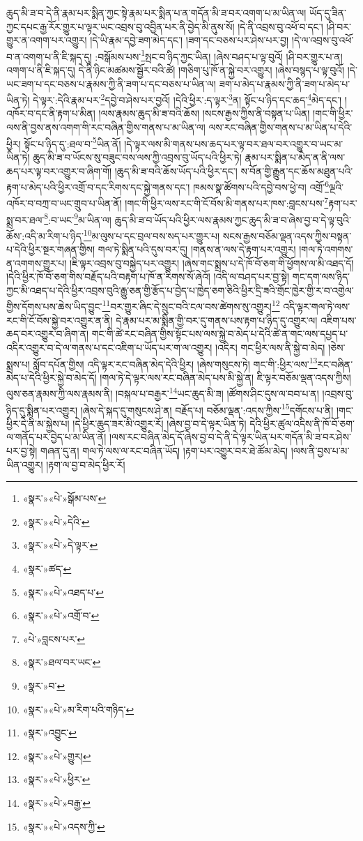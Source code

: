 ཆུད་མི་ཟ་བ་དེ་ནི་རྣམ་པར་སྨིན་ཀྱང་སྟེ་རྣམ་པར་སྨིན་པ་ན་གདོན་མི་ཟ་བར་འགག་པ་མ་ཡིན་ལ། ཡོད་དུ་ཟིན་ཀྱང་དཔང་རྒྱ་རོར་གྱུར་པ་ལྟར་ཡང་འབྲས་བུ་འབྱིན་པར་ནི་བྱེད་མི་ནུས་སོ། །དེ་ནི་འབྲས་བུ་འཕོ་བ་དང་། །ཤི་བར་གྱུར་ན་འགག་པར་འགྱུར། །དེ་ཡི་རྣམ་དབྱེ་ཟག་མེད་དང་། །ཟག་དང་བཅས་པར་ཤེས་པར་བྱ། །དེ་ལ་འབྲས་བུ་འཕོ་བ་ན་འགག་པ་ནི་ཇི་སྐད་དུ། :བསྒོམས་པས་\footnote{«སྣར་»«པེ་»སྒོམ་པས་}སྤང་བ་ཉིད་ཀྱང་ཡིན། །ཞེས་བཤད་པ་ལྟ་བུའོ། །ཤི་བར་གྱུར་པ་ན། འགག་པ་ནི་ཇི་སྐད་དུ། དེ་ནི་ཉིང་མཚམས་སྦྱོར་བའི་ཚེ། །གཅིག་པུ་ཁོ་ན་སྐྱེ་བར་འགྱུར། །ཞེས་བསྙད་པ་ལྟ་བུའོ། །དེ་ཡང་ཟག་པ་དང་བཅས་པ་རྣམས་ཀྱི་ནི་ཟག་པ་དང་བཅས་པ་ཡིན་ལ། ཟག་པ་མེད་པ་རྣམས་ཀྱི་ནི་ཟག་པ་མེད་པ་ཡིན་ཏེ། དེ་ལྟར་:དེའི་རྣམ་པར་\footnote{«སྣར་»«པེ་»དེའི་}དབྱེ་བ་ཤེས་པར་བྱའོ། །དེའི་ཕྱིར་:ད་ལྟར་\footnote{«སྣར་»«པེ་»དེ་ལྟར་}ན། སྟོང་པ་ཉིད་དང་ཆད་\footnote{«སྣར་»ཚད་}མེད་དང་། །འཁོར་བ་དང་ནི་རྟག་པ་མིན། །ལས་རྣམས་ཆུད་མི་ཟ་བའི་ཆོས། །སངས་རྒྱས་ཀྱིས་ནི་བསྟན་པ་ཡིན། །གང་གི་ཕྱིར་ལས་ནི་བྱས་ནས་འགག་གི་རང་བཞིན་གྱིས་གནས་པ་མ་ཡིན་ལ། ལས་རང་བཞིན་གྱིས་གནས་པ་མ་ཡིན་པ་དེའི་ཕྱིར། སྟོང་པ་ཉིད་དུ་:ཐལ་བ་\footnote{«སྣར་»«པེ་»འཐད་པ་}ཡིན་ནོ། །དེ་ལྟར་ལས་མི་གནས་པས་ཆད་པར་ལྟ་བར་ཐལ་བར་འགྱུར་བ་ཡང་མ་ཡིན་ཏེ། ཆུད་མི་ཟ་བ་ཡོངས་སུ་བཟུང་བས་ལས་ཀྱི་འབྲས་བུ་ཡོད་པའི་ཕྱིར་ཏེ། རྣམ་པར་སྨིན་པ་མེད་ན་ནི་ལས་ཆད་པར་ལྟ་བར་འགྱུར་བ་ཞིག་གོ། །ཆུད་མི་ཟ་བའི་ཆོས་ཡོད་པའི་ཕྱིར་དང་། ས་བོན་གྱི་རྒྱུན་དང་ཆོས་མཐུན་པའི་རྟག་པ་མེད་པའི་ཕྱིར་འགྲོ་བ་དང་རིགས་དང་སྐྱེ་གནས་དང་། ཁམས་སྣ་ཚོགས་པའི་དབྱེ་བས་ཕྱེ་བ། འགྲོ་\footnote{«སྣར་»«པེ་»འགྲོ་བ་}ལྔའི་འཁོར་བ་བཀྲ་བ་ཡང་གྲུབ་པ་ཡིན་ནོ། །གང་གི་ཕྱིར་ལས་རང་གི་ངོ་བོས་མི་གནས་པར་ཁས་:བླངས་པས་\footnote{«པེ་»བླངས་པར་}རྟག་པར་སྨྲ་བར་ཐལ་\footnote{«སྣར་»ཐལ་བར་ཡང་}:བ་ཡང་\footnote{«སྣར་»བ་}མ་ཡིན་ལ། ཆུད་མི་ཟ་བ་ཡོད་པའི་ཕྱིར་ལས་རྣམས་ཀྱང་ཆུད་མི་ཟ་བ་ཞེས་བྱ་བ་དེ་ལྟ་བུའི་ཆོས་:འདི་མ་རིག་པ་ཉིད་\footnote{«སྣར་»«པེ་»མ་རིག་པའི་གཉིད་}མ་ལུས་པ་དང་བྲལ་བས་སད་པར་གྱུར་པ། སངས་རྒྱས་བཅོམ་ལྡན་འདས་ཀྱིས་བསྟན་པ་དེའི་ཕྱིར་སྔར་གཞན་གྱིས། གལ་ཏེ་སྨིན་པའི་དུས་བར་དུ། །གནས་ན་ལས་དེ་རྟག་པར་འགྱུར། །གལ་ཏེ་འགགས་ན་འགགས་གྱུར་པ། །ཇི་ལྟར་འབྲས་བུ་བསྐྱེད་པར་འགྱུར། །ཞེས་གང་སྨྲས་པ་དེ་ཁོ་བོ་ཅག་གི་ཕྱོགས་ལ་མི་འཐད་དོ། །དེའི་ཕྱིར་ཁོ་བོ་ཅག་གིས་བརྗོད་པའི་བརྟག་པ་ཁོ་ན་རིགས་སོ་ཞེའོ། །འདི་ལ་བཤད་པར་བྱ་སྟེ། གང་དག་ལས་ཉིད་ཀྱང་མི་འཐད་པ་དེའི་ཕྱིར་འབྲས་བུའི་རྒྱུ་ཅན་གྱི་རྩོད་པ་བྱེད་པ་ཁྱེད་ཅག་ཅིའི་ཕྱིར་དྲི་ཟའི་གྲོང་ཁྱེར་གྱི་ར་བ་འགྱེལ་གྱིས་དོགས་པས་ཆེས་ཡིད་བྱུང་\footnote{«སྣར་»འབྱུང་}བར་གྱུར་ཞིང་དེ་སྲུང་བའི་ངལ་བས་ཚེགས་སུ་འགྱུར།\footnote{«སྣར་»«པེ་»གྱུར།} འདི་ལྟར་གལ་ཏེ་ལས་རང་གི་ངོ་བོས་སྐྱེ་བར་འགྱུར་ན་ནི། དེ་རྣམ་པར་མ་སྨིན་གྱི་བར་དུ་གནས་པས་རྟག་པ་ཉིད་དུ་འགྱུར་ལ། འཇིག་པས་ཆད་བར་འགྱུར་བ་ཞིག་ན། གང་གི་ཚེ་རང་བཞིན་གྱིས་སྟོང་པས་ལས་སྐྱེ་བ་མེད་པ་དེའི་ཚེ་ན་གང་ལས་དཔྱད་པ་འདིར་འགྱུར་བ་དེ་ལ་གནས་པ་དང་འཇིག་པ་ཡོད་པར་ག་ལ་འགྱུར། །འདིར། གང་ཕྱིར་ལས་ནི་སྐྱེ་བ་མེད། །ཅེས་སྨྲས་པ། སློབ་དཔོན་གྱིས། འདི་ལྟར་རང་བཞིན་མེད་དེའི་ཕྱིར། །ཞེས་གསུངས་ཏེ། གང་གི་:ཕྱིར་ལས་\footnote{«སྣར་»«པེ་»ཕྱིར་}རང་བཞིན་མེད་པ་དེའི་ཕྱིར་སྐྱེ་བ་མེད་དོ། །གལ་ཏེ་དེ་ལྟར་ལས་རང་བཞིན་མེད་པས་མི་སྐྱེ་ན། ཇི་ལྟར་བཅོམ་ལྡན་འདས་ཀྱིས། ལུས་ཅན་རྣམས་ཀྱི་ལས་རྣམས་ནི། །བསྐལ་པ་བརྒྱར་\footnote{«སྣར་»«པེ་»བརྒྱ་}ཡང་ཆུད་མི་ཟ། །ཚོགས་ཤིང་དུས་ལ་བབ་པ་ན། །འབྲས་བུ་ཉིད་དུ་སྨིན་པར་འགྱུར། །ཞེས་དེ་སྐད་དུ་གསུངས་ཤེ་ན། བརྗོད་པ། བཅོམ་ལྡན་:འདས་ཀྱིས་\footnote{«སྣར་»«པེ་»འདས་ཀྱི་}དགོངས་པ་ནི། །གང་ཕྱིར་དེ་ནི་མ་སྐྱེས་པ། །དེ་ཕྱིར་ཆུད་ཟར་མི་འགྱུར་རོ། །ཞེས་བྱ་བ་དེ་ལྟར་ཡིན་ཏེ། དེའི་ཕྱིར་ཚུལ་འདིས་ནི་ཁོ་བོ་ཅག་ལ་གནོད་པར་བྱེད་པ་མ་ཡིན་ནོ། །ལས་རང་བཞིན་མེད་དོ་ཞེས་བྱ་བ་དེ་ནི་དེ་ལྟར་ཡིན་པར་གདོན་མི་ཟ་བར་ཤེས་པར་བྱ་སྟེ། གཞན་དུ་ན། གལ་ཏེ་ལས་ལ་རང་བཞིན་ཡོད། །རྟག་པར་འགྱུར་བར་ཐེ་ཚོམ་མེད། །ལས་ནི་བྱས་པ་མ་ཡིན་འགྱུར། །རྟག་ལ་བྱ་བ་མེད་ཕྱིར་རོ། 